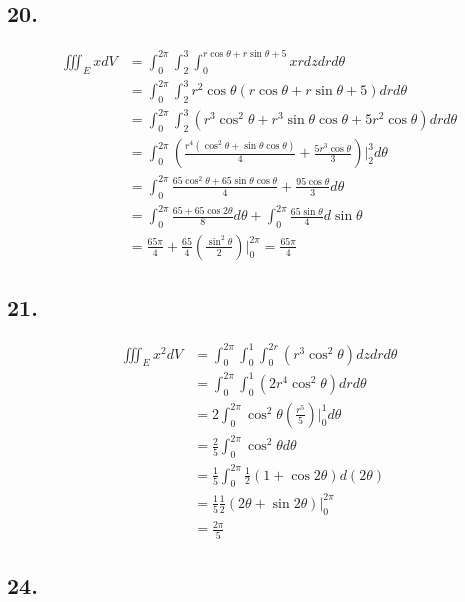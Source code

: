 \documentclass{article}
\begin{document}
  \subsection*{20. }

  $$\begin{aligned}
    \iiint_E x dV &= \int_0^{2\pi} \int_2^3 \int_0^{r\cos \theta + r\sin \theta + 5} xr dz dr d\theta \\
    &= \int_0^{2\pi} \int_2^3 r^2 \cos \theta (r\cos \theta + r\sin \theta + 5) dr d\theta \\
    &= \int_0^{2\pi} \int_2^3 (r^3\cos^2 \theta + r^3 \sin \theta \cos \theta + 5r^2\cos \theta) dr d\theta  \\
    &= \int_0^{2\pi} (\frac{r^4(\cos^2 \theta + \sin \theta \cos \theta)}{4} + \frac{5r^3\cos \theta}{3})\biggl|_2^3 d\theta \\
    &= \int_0^{2\pi} \frac{65 \cos^2 \theta + 65\sin \theta \cos \theta}{4} + \frac{95\cos \theta}{3} d\theta \\
    &= \int_0^{2\pi} \frac{65+65\cos 2\theta}{8} d\theta + \int_0^{2\pi}\frac{65\sin \theta}{4} d\sin \theta \\
    &= \frac{65\pi}{4} + \frac{65}{4} (\frac{\sin^2 \theta}{2})\biggl|_0^{2\pi} = \frac{65\pi}{4}
  \end{aligned}$$

  \subsection*{21. }

  $$\begin{aligned}
    \iiint_E x^2 dV &= \int_0^{2\pi} \int_0^1 \int_0^{2r} (r^3 \cos^2 \theta ) dz dr d\theta \\
    &= \int_0^{2\pi} \int_0^1 (2r^4\cos^2 \theta) dr d\theta \\
    &= 2\int_0^{2\pi} \cos^2 \theta (\frac{r^5}{5})\biggl|_0^1 d\theta \\
    &= \frac 2 5 \int_0^{2\pi} \cos^2 \theta d\theta \\
    &= \frac 1 5 \int_0^{2\pi} \frac 1 2 (1 + \cos 2\theta) d(2\theta) \\
    &= \frac 1 5 \frac 1 2 (2 \theta + \sin 2\theta)\biggl|_0^{2\pi} \\
    &= \frac{2\pi}{5}
  \end{aligned}$$

  \subsection*{24. }
\end{document}

